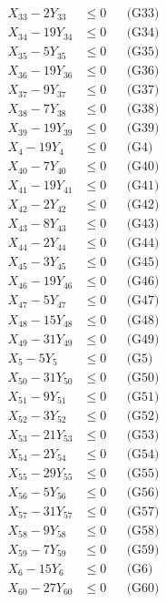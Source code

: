 \documentclass[a4paper,10pt]{article}
\begin{document}
{\begin{align}
X_{33} - 2Y_{33} &\leq 0 && \text{(G33)} \\
\allowbreak
X_{34} - 19Y_{34} &\leq 0 && \text{(G34)} \\
X_{35} - 5Y_{35} &\leq 0 && \text{(G35)} \\
X_{36} - 19Y_{36} &\leq 0 && \text{(G36)} \\
X_{37} - 9Y_{37} &\leq 0 && \text{(G37)} \\
X_{38} - 7Y_{38} &\leq 0 && \text{(G38)} \\
X_{39} - 19Y_{39} &\leq 0 && \text{(G39)} \\
X_{4} - 19Y_{4} &\leq 0 && \text{(G4)} \\
X_{40} - 7Y_{40} &\leq 0 && \text{(G40)} \\
X_{41} - 19Y_{41} &\leq 0 && \text{(G41)} \\
X_{42} - 2Y_{42} &\leq 0 && \text{(G42)} \\
X_{43} - 8Y_{43} &\leq 0 && \text{(G43)} \\
X_{44} - 2Y_{44} &\leq 0 && \text{(G44)} \\
X_{45} - 3Y_{45} &\leq 0 && \text{(G45)} \\
X_{46} - 19Y_{46} &\leq 0 && \text{(G46)} \\
X_{47} - 5Y_{47} &\leq 0 && \text{(G47)} \\
X_{48} - 15Y_{48} &\leq 0 && \text{(G48)} \\
X_{49} - 31Y_{49} &\leq 0 && \text{(G49)} \\
X_{5} - 5Y_{5} &\leq 0 && \text{(G5)} \\
X_{50} - 31Y_{50} &\leq 0 && \text{(G50)} \\
X_{51} - 9Y_{51} &\leq 0 && \text{(G51)} \\
\allowbreak
X_{52} - 3Y_{52} &\leq 0 && \text{(G52)} \\
X_{53} - 21Y_{53} &\leq 0 && \text{(G53)} \\
X_{54} - 2Y_{54} &\leq 0 && \text{(G54)} \\
X_{55} - 29Y_{55} &\leq 0 && \text{(G55)} \\
X_{56} - 5Y_{56} &\leq 0 && \text{(G56)} \\
X_{57} - 31Y_{57} &\leq 0 && \text{(G57)} \\
X_{58} - 9Y_{58} &\leq 0 && \text{(G58)} \\
X_{59} - 7Y_{59} &\leq 0 && \text{(G59)} \\
X_{6} - 15Y_{6} &\leq 0 && \text{(G6)} \\
X_{60} - 27Y_{60} &\leq 0 && \text{(G60)} \\

\end{align}}
\end{document}
